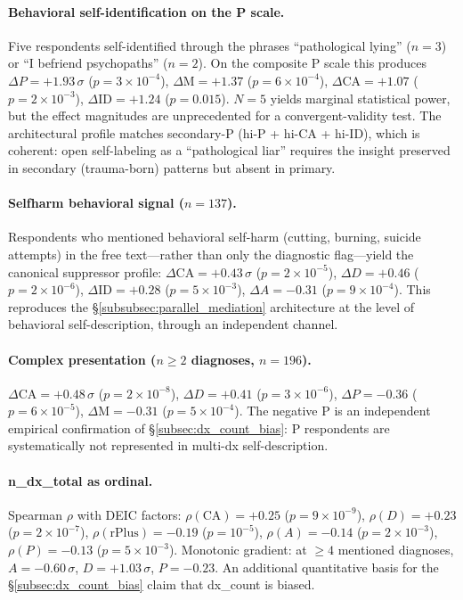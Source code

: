 \paragraph{Behavioral self-identification on the P scale.} Five respondents self-identified through the phrases ``pathological lying'' ($n = 3$) or ``I befriend psychopaths'' ($n = 2$). On the composite P scale this produces $\Delta P = +1.93\,\sigma$ ($p = 3 \times 10^{-4}$), $\Delta \text{M} = +1.37$ ($p = 6 \times 10^{-4}$), $\Delta \text{CA} = +1.07$ ($p = 2 \times 10^{-3}$), $\Delta \text{ID} = +1.24$ ($p = 0.015$). $N = 5$ yields marginal statistical power, but the effect magnitudes are unprecedented for a convergent-validity test. The architectural profile matches secondary-P (hi-P + hi-CA + hi-ID), which is coherent: open self-labeling as a ``pathological liar'' requires the insight preserved in secondary (trauma-born) patterns but absent in primary.

\paragraph{Selfharm behavioral signal ($n = 137$).} Respondents who mentioned behavioral self-harm (cutting, burning, suicide attempts) in the free text---rather than only the diagnostic flag---yield the canonical suppressor profile: $\Delta \text{CA} = +0.43\,\sigma$ ($p = 2 \times 10^{-5}$), $\Delta D = +0.46$ ($p = 2 \times 10^{-6}$), $\Delta \text{ID} = +0.28$ ($p = 5 \times 10^{-3}$), $\Delta A = -0.31$ ($p = 9 \times 10^{-4}$). This reproduces the §\ref{subsubsec:parallel_mediation} architecture at the level of behavioral self-description, through an independent channel.

\paragraph{Complex presentation ($n \geq 2$ diagnoses, $n = 196$).} $\Delta \text{CA} = +0.48\,\sigma$ ($p = 2 \times 10^{-8}$), $\Delta D = +0.41$ ($p = 3 \times 10^{-6}$), \textbf{$\Delta P = -0.36$} ($p = 6 \times 10^{-5}$), $\Delta \text{M} = -0.31$ ($p = 5 \times 10^{-4}$). The negative P is an independent empirical confirmation of §\ref{subsec:dx_count_bias}: P respondents are systematically not represented in multi-dx self-description.

\paragraph{n\_dx\_total as ordinal.} Spearman $\rho$ with DEIC factors: $\rho(\text{CA}) = +0.25$ ($p = 9 \times 10^{-9}$), $\rho(D) = +0.23$ ($p = 2 \times 10^{-7}$), $\rho(\text{rPlus}) = -0.19$ ($p = 10^{-5}$), $\rho(A) = -0.14$ ($p = 2 \times 10^{-3}$), $\rho(P) = -0.13$ ($p = 5 \times 10^{-3}$). Monotonic gradient: at $\geq 4$ mentioned diagnoses, $A = -0.60\,\sigma$, $D = +1.03\,\sigma$, $P = -0.23$. An additional quantitative basis for the §\ref{subsec:dx_count_bias} claim that dx\_count is biased.


